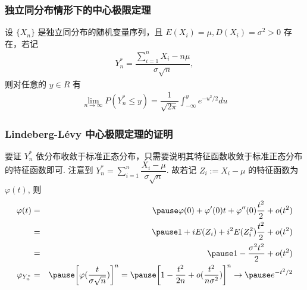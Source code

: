 \begin{frame}
	\frametitle{独立同分布情形下的中心极限定理}
	\begin{thm} 设 $\{X_n\}$ 是独立同分布的随机变量序列，且 $E (X_i)=\mu, D (X_i)=\sigma^2>0$ 存在，若记
		\begin{eqnarray*}
			Y_n^*=\dfrac{\sum_{i=1}^nX_i-n\mu}{\sigma\sqrt{n}},
		\end{eqnarray*}
		则对任意的 $y\in R$ 有
		\begin{eqnarray*}
			\lim_{n\rightarrow\infty}P(Y_n^*\le y)=\dfrac{1}{\sqrt{2\pi}}\int_{-\infty}^ye^{-u^2/2}du
		\end{eqnarray*}

	\end{thm}
\end{frame}
\begin{frame}
	\frametitle{Lindeberg-L{\'e}vy 中心极限定理的证明}
	\zheng 要证 $Y_n^*$ 依分布收敛于标准正态分布，只需要说明其特征函数收敛于标准正态分布的特征函数即可. \pause 注意到 $Y_n^*=\sum_{i=1}^n\dfrac{X_i-\mu}{\sigma\sqrt{n}}$. 故若记 $Z_i:=X_i-\mu$ 的特征函数为 $\varphi (t)$, 则
	\begin{eqnarray*}
		\varphi(t)&=&\pause \varphi(0)+\varphi'(0)t+\varphi''(0)\frac{t^2}{2}+o(t^2)\\
		&=&\pause 1+iE(Z_i)+i^2E(Z_i^2)\frac{t^2}{2}+o(t^2)\\
		&=&\pause 1-\frac{\sigma^2t^2}{2}+o(t^2)\\
		\varphi_{Y_n^*}&=&\pause \bigg[\varphi(\frac{t}{\sigma\sqrt{n}})\bigg]^n=\pause \bigg[1-\frac{t^2}{2n}+o(\frac{t^2}{n\sigma^2})\bigg]^n\rightarrow \pause e^{-t^2/2}
	\end{eqnarray*}

\end{frame}
